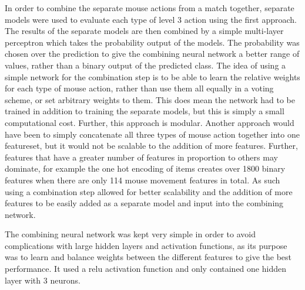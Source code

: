 \documentclass[Report.tex]{subfiles}
\begin{document}
In order to combine the separate mouse actions from a match together, separate models were used to evaluate each type of level 3 action using the first approach. The results of the separate models are then combined by a simple multi-layer perceptron which takes the probability output of the models. The probability was chosen over the prediction to give the combining neural network a better range of values, rather than a binary output of the predicted class. The idea of using a simple network for the combination step is to be able to learn the relative weights for each type of mouse action, rather than use them all equally in a voting scheme, or set arbitrary weights to them. This does mean the network had to be trained in addition to training the separate models, but this is simply a small computational cost. Further, this approach is modular. Another approach would have been to simply concatenate all three types of mouse action together into one featureset, but it would not be scalable to the addition of more features. Further, features that have a greater number of features in proportion to others may dominate, for example the one hot encoding of items creates over 1800 binary features when there are only 114 mouse movement features in total. As such using a combination step allowed for better scalability and the addition of more features to be easily added as a separate model and input into the combining network.

The combining neural network was kept very simple in order to avoid complications with large hidden layers and activation functions, as its purpose was to learn and balance weights between the different features to give the best performance. It used a relu activation function and only contained one hidden layer with 3 neurons.
\end{document}
